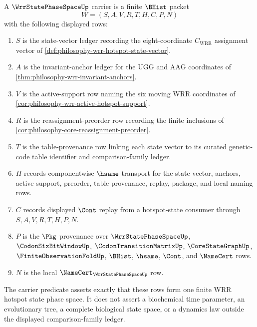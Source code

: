 \begin{definition}
\label{def:wrr-state-phase-space-carrier}
A $\WrrStatePhaseSpaceUp$ carrier is a finite $\BHist$ packet
$$
W=(S,A,V,R,T,H,C,P,N)
$$
with the following displayed rows:
\begin{enumerate}
\item $S$ is the state-vector ledger recording the eight-coordinate $C_{\mathrm{WRR}}$ assignment vector of \autoref{def:philosophy-wrr-hotspot-state-vector}.
\item $A$ is the invariant-anchor ledger for the $\mathrm{UGG}$ and $\mathrm{AAG}$ coordinates of \autoref{thm:philosophy-wrr-invariant-anchors}.
\item $V$ is the active-support row naming the six moving WRR coordinates of \autoref{cor:philosophy-wrr-active-hotspot-support}.
\item $R$ is the reassignment-preorder row recording the finite inclusions of \autoref{cor:philosophy-core-reassignment-preorder}.
\item $T$ is the table-provenance row linking each state vector to its curated genetic-code table identifier and comparison-family ledger.
\item $H$ records componentwise $\hsame$ transport for the state vector, anchors, active support, preorder, table provenance, replay, package, and local naming rows.
\item $C$ records displayed $\Cont$ replay from a hotspot-state consumer through $S,A,V,R,T,H,P,N$.
\item $P$ is the $\Pkg$ provenance over $\WrrStatePhaseSpaceUp$, $\CodonSixBitWindowUp$, $\CodonTransitionMatrixUp$, $\CoreStateGraphUp$, $\FiniteObservationFoldUp$, $\BHist$, $\hsame$, $\Cont$, and $\NameCert$ rows.
\item $N$ is the local $\NameCert_{\WrrStatePhaseSpaceUp}$ row.
\end{enumerate}
The carrier predicate asserts exactly that these rows form one finite WRR hotspot state phase space. It does not assert a biochemical time parameter, an evolutionary tree, a complete biological state space, or a dynamics law outside the displayed comparison-family ledger.
\end{definition}

